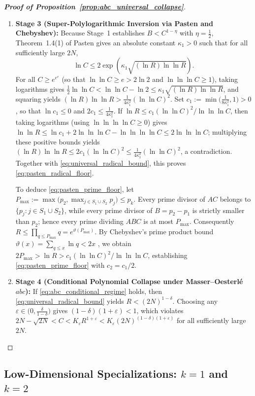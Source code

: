 \documentclass[11pt,a4paper]{article}
\theoremstyle{definition}
\begin{document}
\begin{proof}[\textbf{Proof of Proposition~\ref{prop:abc_universal_collapse}}]
\begin{enumerate}
    \item \textbf{Stage 3 (Super-Polylogarithmic Inversion via Pasten and Chebyshev):} Because Stage~1 establishes $B < C^{1 - \eta}$ with $\eta = \frac{1}{2}$, Theorem~1.4(1) of Pasten \cite{pasten2024} gives an absolute constant $\kappa_1 > 0$ such that for all sufficiently large $2N$,
    \[
    \ln C \le 2 \exp\!\left(\kappa_1 \sqrt{(\ln R)\ln\ln R}\right).
    \]
    For all $C \ge e^{e^e}$ (so that $\ln\ln C \ge e > 2\ln 2$ and $\ln\ln\ln C \ge 1$), taking logarithms gives $\frac{1}{2}\ln\ln C < \ln\ln C - \ln 2 \le \kappa_1 \sqrt{(\ln R)\ln\ln R}$, and squaring yields $(\ln R)\ln\ln R > \frac{1}{4\kappa_1^2}(\ln\ln C)^2$. Set $c_1 := \min\bigl(\frac{1}{8\kappa_1^2}, 1\bigr) > 0$, so that $\ln c_1 \le 0$ and $2 c_1 \le \frac{1}{4\kappa_1^2}$. If $\ln R \le c_1 (\ln\ln C)^2 / \ln\ln\ln C$, then taking logarithms (using $\ln\ln\ln\ln C \ge 0$) gives $\ln\ln R \le \ln c_1 + 2\ln\ln\ln C - \ln\ln\ln\ln C \le 2\ln\ln\ln C$; multiplying these positive bounds yields $(\ln R)\ln\ln R \le 2 c_1 (\ln\ln C)^2 \le \frac{1}{4\kappa_1^2}(\ln\ln C)^2$, a contradiction. Together with \eqref{eq:universal_radical_bound}, this proves \eqref{eq:pasten_radical_floor}.

    To deduce \eqref{eq:pasten_prime_floor}, let $P_{\max} := \max\bigl(p_2, \max_{j \in S_1 \cup S_2} p_j\bigr) \le p_k$. Every prime divisor of $AC$ belongs to $\{p_j : j \in S_1 \cup S_2\}$, while every prime divisor of $B = p_2 - p_1$ is strictly smaller than $p_2$; hence every prime dividing $ABC$ is at most $P_{\max}$. Consequently $R \le \prod_{q \le P_{\max}} q = e^{\vartheta(P_{\max})}$. By Chebyshev's prime product bound $\vartheta(x) = \sum_{q \le x} \ln q < 2x$ \cite{chebyshev1852}, we obtain $2 P_{\max} > \ln R > c_1 (\ln\ln C)^2 / \ln\ln\ln C$, establishing \eqref{eq:pasten_prime_floor} with $c_2 = c_1 / 2$.

    \item \textbf{Stage 4 (Conditional Polynomial Collapse under Masser--Oesterl\'e $abc$):} If \eqref{eq:abc_conditional_regime} holds, then \eqref{eq:universal_radical_bound} yields $R < (2N)^{1 - \delta}$. Choosing any $\varepsilon \in \bigl(0, \frac{\delta}{1 - \delta}\bigr)$ gives $(1 - \delta)(1 + \varepsilon) < 1$, which violates $2N - \sqrt{2N} < C < K_\varepsilon R^{1+\varepsilon} < K_\varepsilon (2N)^{(1 - \delta)(1 + \varepsilon)}$ for all sufficiently large $2N$.
\end{enumerate}
\end{proof}

\subsection{Low-Dimensional Specializations: \texorpdfstring{$k = 1$}{k = 1} and \texorpdfstring{$k = 2$}{k = 2}}
\label{subsec:k1_k2}
\end{document}
